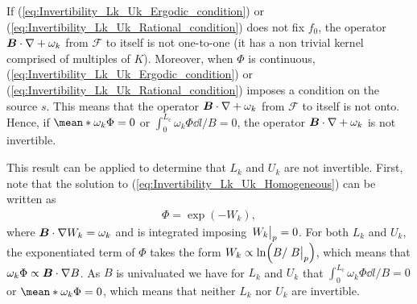 If (\ref{eq:Invertibility_Lk_Uk_Ergodic_condition}) or (\ref{eq:Invertibility_Lk_Uk_Rational_condition}) does not fix $f_0$, the operator $\vb*{B}\cdot\nabla + \omega_k$ from $\mathcal{F}$ to itself is not one-to-one (it has a non trivial kernel comprised of multiples of $K$).  
Moreover, when $\Phi$ is continuous, (\ref{eq:Invertibility_Lk_Uk_Ergodic_condition}) or (\ref{eq:Invertibility_Lk_Uk_Rational_condition}) imposes a condition on the source $s$. This means that the operator $\vb*{B}\cdot\nabla + \omega_k$ from $\mathcal{F}$ to itself is not onto. Hence, if $\mean*{\omega_k \Phi} =0 $ or $\int_{0}^{L_{\text{c}}} \omega_k \Phi {\dd{l}}/{B} = 0$, the operator $\vb*{B}\cdot\nabla + \omega_k$ is not invertible. 

This result can be applied to determine that $L_k$ and $U_k$ are not invertible. First, note that the solution to (\ref{eq:Invertibility_Lk_Uk_Homogeneous}) can be written as
%
\begin{align}
	\Phi = \exp(-W_k), 
	\label{eq:Invertibility_Lk_Uk_Homogeneous_solution}
\end{align}
where $\vb*{B}\cdot\nabla W_k = \omega_k$ and is integrated imposing $\eval{W_k}_{p}=0$. For both $L_k$ and $U_k$, the exponentiated term of $\Phi$ takes the form $W_k \propto \ln(B/\eval{B}_{p})$, which means that $\omega_k \Phi \propto \vb*{B}\cdot\nabla B $. As $B$ is univaluated we have for $L_k$ and $U_k$ that $\int_{0}^{L_{\text{c}}} \omega_k \Phi {\dd{l}}/{B} =  0$ or $\mean*{\omega_k \Phi}=0$, which means that neither $L_k$ nor $U_k$ are invertible.

